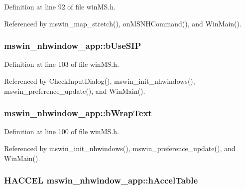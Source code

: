 Definition at line 92 of file win\+M\+S.\+h.



Referenced by mswin\+\_\+map\+\_\+stretch(), on\+M\+S\+N\+H\+Command(), and Win\+Main().

\hypertarget{structmswin__nhwindow__app_af8a7fc1fc5568f109bb31fd054a38470}{
\subsubsection[{b\+Use\+S\+I\+P}]{ mswin\+\_\+nhwindow\+\_\+app\+::b\+Use\+S\+I\+P}}\label{structmswin__nhwindow__app_af8a7fc1fc5568f109bb31fd054a38470}


Definition at line 103 of file win\+M\+S.\+h.



Referenced by Check\+Input\+Dialog(), mswin\+\_\+init\+\_\+nhwindows(), mswin\+\_\+preference\+\_\+update(), and Win\+Main().

\hypertarget{structmswin__nhwindow__app_a602ad0b692afb2be5e62dbec41942b17}{
\subsubsection[{b\+Wrap\+Text}]{ mswin\+\_\+nhwindow\+\_\+app\+::b\+Wrap\+Text}}\label{structmswin__nhwindow__app_a602ad0b692afb2be5e62dbec41942b17}


Definition at line 100 of file win\+M\+S.\+h.



Referenced by mswin\+\_\+init\+\_\+nhwindows(), mswin\+\_\+preference\+\_\+update(), and Win\+Main().

\hypertarget{structmswin__nhwindow__app_a98c007521f1719b18eeb1f11c76549d4}{
\subsubsection[{h\+Accel\+Table}]{\setlength{\rightskip}{0pt plus 5cm}H\+A\+C\+C\+E\+L mswin\+\_\+nhwindow\+\_\+app\+::h\+Accel\+Table}}\label{structmswin__nhwindow__app_a98c007521f1719b18eeb1f11c76549d4}


